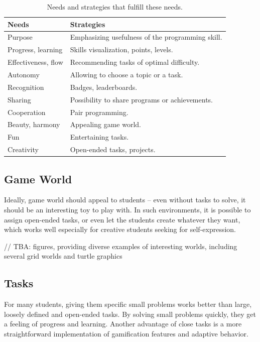 \begin{table}[htb]
\centering
\begin{tabular}{ll}
\toprule
Needs & Strategies \\
\midrule
Purpose & Emphasizing usefulness of the programming skill. \\ %
Progress, learning & Skills visualization, points, levels. \\
Effectiveness, flow & Recommending tasks of optimal difficulty. \\ %
Autonomy & Allowing to choose a topic or a task. \\
Recognition & Badges, leaderboards. \\  %
Sharing & Possibility to share programs or achievements. \\
Cooperation & Pair programming. \\
Beauty, harmony & Appealing game world. \\ %
Fun & Entertaining tasks. \\
Creativity & Open-ended tasks, projects. \\  %
\bottomrule
\end{tabular}
\caption{Needs and strategies that fulfill these needs.}
\label{tbl:motivation-strategies}
\end{table}



\subsection{Game World}
\label{sec:motivation.game-world}
Ideally, game world should appeal to students --
even without tasks to solve,
  it should be an interesting toy to play with.
In such environments, it is possible to assign open-ended tasks,
  or even let the students create whatever they want,
  which works well especially for creative students seeking for self-expression.

// TBA: figures, providing diverse examples of interesting worlds, including several grid worlds and turtle graphics


\subsection{Tasks}
\label{sec:motivation.tasks}
For many students, giving them specific small problems works better
  than large, loosely defined and open-ended tasks.
By solving small problems quickly,
  they get a feeling of progress and learning.
Another advantage of close tasks
  is a more straightforward implementation of gamification features and adaptive behavior.

